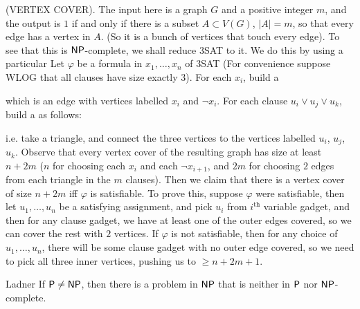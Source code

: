 \documentclass{article}
\begin{document}
\begin{ex*} (VERTEX COVER). The input here is a graph $G$ and a positive integer $m$, and the output is $1$ if and only if there is a subset $A \subset V(G)$, $|A|=m$, so that every edge has a vertex in $A$. (So it is a bunch of vertices that touch every edge). To see that this is $\mathsf{NP}$-complete, we shall reduce 3SAT to it. We do this by using a particular  Let $\varphi$ be a formula in $x_{1},\dots,x_{n}$ of 3SAT (For convenience suppose WLOG that all clauses have size exactly $3$). For each $x_{i}$, build a  \begin{center}
\end{center}
which is an edge with vertices labelled $x_{i}$ and $\neg x_{i}$. For each clause $u_{i} \vee u_{j} \vee u_{k}$, build a  as follows: \begin{center}
\end{center}
i.e. take a triangle, and connect the three vertices to the vertices labelled $u_{i}$, $u_{j}$, $u_{k}$. Observe that every vertex cover of the resulting graph has size at least $n +2m$ ($n$ for choosing each $x_{i}$ and each $\neg x_{i+1}$, and $2m$ for choosing $2$ edges from each triangle in the $m$ clauses). Then we claim that there is a vertex cover of size $n+2m$ iff $\varphi$ is satisfiable. \gap To prove this, suppose $\varphi$ were satisfiable, then let $u_{1},\dots,u_{n}$ be a satisfying assignment, and pick $u_{i}$ from $i^{\text{th}}$ variable gadget, and then for any clause gadget, we have at least one of the outer edges covered, so we can cover the rest with $2$ vertices. If $\varphi$ is not satisfiable, then for any choice of $u_{1}, \dots, u_{n}$, there will be some clause gadget with no outer edge covered, so we need to pick all three inner vertices, pushing us to $ \geq n+2m+1$.
\end{ex*}
\begin{fancythm}{Ladner}
    If $\mathsf{P} \neq \mathsf{NP}$, then there is a problem in $\mathsf{NP}$ that is neither in $\mathsf{P}$ nor $\mathsf{NP}$-complete.
\end{fancythm}
\end{document}
